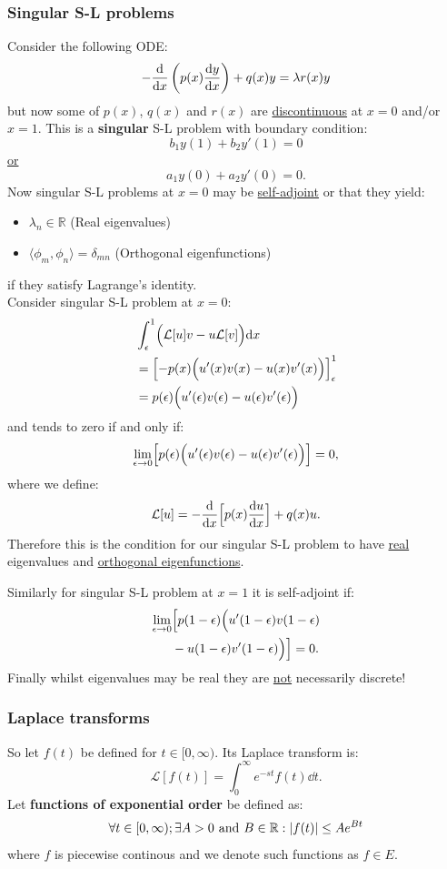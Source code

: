 \documentclass{article}
\begin{document}
\begin{multicols}{3}
\subsubsection*{Singular S-L problems}
Consider the following ODE:
$$-\dv{x}\left(p(x)\dv{y}{x}\right)+q(x)y=\lambda r(x)y$$
but now some of $p(x)$, $q(x)$ and $r(x)$ are \underline{discontinuous}
at $x=0$ and/or $x=1$.
This is a \textbf{singular} S-L problem with boundary condition:
$$b_1 y(1)+b_2 y'(1)=0$$
\underline{or}
$$a_1 y(0)+a_2 y'(0)=0.$$
Now singular S-L problems at $x=0$ may be
\underline{self-adjoint} or that they yield:
\begin{itemize}
    \item $\lambda_n\in\mathbb{R}$ (Real eigenvalues)
    \item $\langle \phi_m,\phi_n \rangle=\delta_{mn}$
    (Orthogonal eigenfunctions)
\end{itemize}
if they satisfy Lagrange's identity. \\
Consider singular S-L problem at $x=0$:
\begin{align*}
    &\int_{\epsilon}^{1}\Bigl(\mathcal{L}[u]v
    -u\mathcal{L}[v]\Bigr)\dd x \\
    &=\Bigl[-p(x)
    \Bigl(u'(x)v(x)-u(x)v'(x)\Bigr)\Bigr]_{\epsilon}^{1} \\
    &=p(\epsilon)
    \Bigl(u'(\epsilon)v(\epsilon)-u(\epsilon)v'(\epsilon)\Bigr)
\end{align*}
and tends to zero if and only if:
$$\lim_{\epsilon\rightarrow0}
\Bigl[p(\epsilon)
\Bigl(u'(\epsilon)v(\epsilon)-u(\epsilon)v'(\epsilon)\Bigr)\Bigr]=0,$$
where we define:
$$\mathcal{L}[u]=-\dv{x}\Bigl[p(x)\dv{u}{x}\Bigr]+q(x)u.$$
Therefore this is the condition for our singular S-L
problem to have \underline{real} eigenvalues and 
\underline{orthogonal eigenfunctions}.

Similarly for singular S-L problem at $x=1$ it is self-adjoint if:
\begin{align*}
    \lim_{\epsilon\rightarrow0}
    &\Bigl[p(1-\epsilon)
    \Bigl(u'(1-\epsilon)v(1-\epsilon) \\ &-u(1-\epsilon)v'(1-\epsilon)\Bigr)\Bigr]
    =0.
\end{align*}
Finally whilst eigenvalues may be real they are \underline{not}
necessarily discrete!

\subsubsection*{Laplace transforms}
So let $f(t)$ be defined for $t\in[0,\infty)$. Its Laplace transform is:
$$\mathcal{L}[f(t)]=\int_{0}^{\infty}e^{-st}f(t)\dd t.$$
Let \textbf{functions of exponential order} be defined as:
$$\forall t\in[0,\infty);\exists A>0\hspace{0.05in}\text{and}\hspace{0.05in}
B\in\mathbb{R}:|f(t)|\leq Ae^{Bt}$$
where $f$ is piecewise continous and
we denote such functions as $f\in E$.


\end{multicols}
\end{document}
